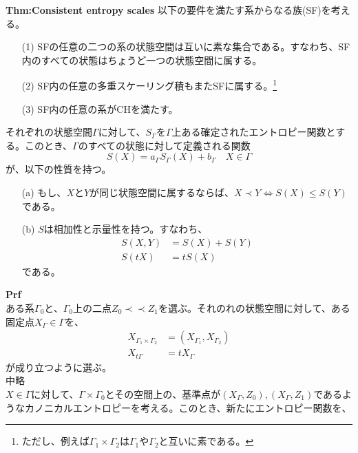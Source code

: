 \documentclass[a4paper,11pt]{jsarticle}
\begin{document}
\begin{itembox}[l]{\textbf{Thm:Consistent entropy scales}}
以下の要件を満たす系からなる族(SF)を考える。\\
\begin{itemize}
    \item[(1)] SFの任意の二つの系の状態空間は互いに素な集合である。すなわち、SF内のすべての状態はちょうど一つの状態空間に属する。\\
    \item[(2)] SF内の任意の多重スケーリング積もまたSFに属する。\footnote{ただし、例えば$\Gamma_1 \times \Gamma_2$は$\Gamma_1$や$\Gamma_2$と互いに素である。}\\
    \item[(3)] SF内の任意の系がCHを満たす。\\
\end{itemize}
それぞれの状態空間$\Gamma$に対して、$S_{\Gamma}$を$\Gamma$上ある確定されたエントロピー関数とする。このとき、$\Gamma$のすべての状態に対して定義される関数
\begin{equation}
    S(X) = a_{\Gamma}S_{\Gamma}(X)+b_{\Gamma} \quad X \in \Gamma
\end{equation}
が、以下の性質を持つ。\\
\begin{itemize}
    \item[(a)] もし、$X$と$Y$が同じ状態空間に属するならば、$X \prec Y \Leftrightarrow S(X) \leq S(Y)$である。\\
    \item[(b)] $S$は相加性と示量性を持つ。すなわち、
    \begin{align}
        S(X,Y) &= S(X)+S(Y)\\
        S(tX) &= tS(X)
    \end{align}
    である。\\
\end{itemize}
\end{itembox}
\textbf{Prf}\\
ある系$\Gamma_0$と、$\Gamma_0$上の二点$Z_0 \prec \prec Z_1$を選ぶ。それのれの状態空間に対して、ある固定点$X_{\Gamma}\in \Gamma$を、
\begin{align}
    X_{\Gamma_1 \times \Gamma_2} &= (X_{\Gamma_1},X_{\Gamma_2})\\
    X_{t\Gamma} &= tX_{\Gamma}
\end{align}
が成り立つように選ぶ。\\
中略\\
$X \in \Gamma$に対して、$\Gamma \times \Gamma_0$とその空間上の、基準点が$(X_{\Gamma},Z_0),(X_{\Gamma},Z_1)$であるようなカノニカルエントロピーを考える。このとき、新たにエントロピー関数を、
\end{document}
